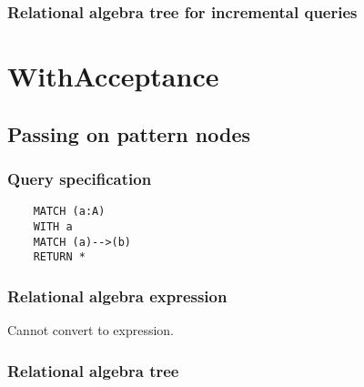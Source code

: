 
	\subsubsection*{Relational algebra tree for incremental queries}


	\section{WithAcceptance}

	\subsection{Passing on pattern nodes}

	\subsubsection*{Query specification}

	\begin{lstlisting}
	MATCH (a:A)
	WITH a
	MATCH (a)-->(b)
	RETURN *
	\end{lstlisting}


	\subsubsection*{Relational algebra expression}

	Cannot convert to expression.

	\subsubsection*{Relational algebra tree}

